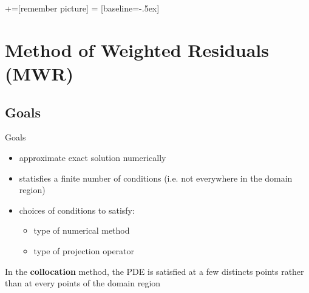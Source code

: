 %
%
%
%
%

\date{January 7 2008}



+=[remember picture]
 = [baseline=-.5ex]

\everymath{\displaystyle}

\subtitle{}

\begin{frame}
  \maketitle
\end{frame}

\begin{frame}
  \tableofcontents
\end{frame}

\section[Weighted Residuals]{Method of Weighted Residuals (MWR)}
\label{sec:meth-weight-resid}

\subsection{Goals}
\label{sec:goals}

\begin{frame}{Goals}
  \begin{itemize}
  \item approximate exact solution numerically
  \item statisfies a finite number of conditions (i.e. not everywhere in the domain region)
  \item choices of conditions to satisfy:
    \begin{itemize}
    \item type of numerical method
    \item type of projection operator
    \end{itemize}
  \end{itemize}
  \begin{example}
    In the \textbf{collocation} method, the PDE is satisfied at a few
    distincts points rather than at every points of the domain
    region
  \end{example}
\end{frame}

